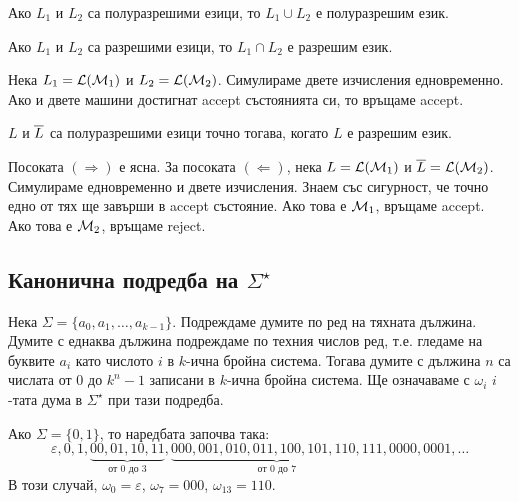 \begin{prop}
  Ако $L_1$ и $L_2$ са полуразрешими езици, то $L_1 \cup L_2$ е полуразрешим език.
\end{prop}

\begin{prop}
  Ако $L_1$ и $L_2$ са разрешими езици, то $L_1 \cap L_2$ е разрешим език.
\end{prop}
\begin{hint}
  Нека $L_1 = \mathcal{L}(\mathcal{M}_1)$ и $L_2 = \mathcal{L}(\mathcal{M}_2)$.
  Симулираме двете изчисления едновременно.
  Ако и двете машини достигнат accept състоянията си, то връщаме accept.
\end{hint}

\begin{framed}
  \begin{thm}
    $L$ и $\overline{L}$ са полуразрешими езици точно тогава, когато $L$ е разрешим език.
  \end{thm}
\end{framed}
\begin{hint}
  Посоката $(\Rightarrow)$ е ясна.
  За посоката $(\Leftarrow)$, нека $L = \mathcal{L}(\mathcal{M}_1)$ и $\overline{L} = \mathcal{L}(\mathcal{M}_2)$.
  Симулираме едновременно и двете изчисления.
  Знаем със сигурност, че точно едно от тях ще завърши в accept състояние.
  Ако това е $\mathcal{M}_1$, връщаме accept.
  Ако това е $\mathcal{M}_2$, връщаме reject.
\end{hint}

\subsection*{Канонична подредба на $\Sigma^\star$}

Нека $\Sigma = \{a_0,a_1,\dots,a_{k-1}\}$.
Подреждаме думите по ред на тяхната дължина.
Думите с еднаква дължина подреждаме по техния числов ред, т.е.
гледаме на буквите $a_i$ като числото $i$ в $k$-ична бройна система.
Тогава думите с дължина $n$ са числата от $0$ до $k^n-1$ записани в $k$-ична бройна система.
Ще означаваме с $\omega_i$ $i$-тата дума в $\Sigma^\star$ при тази подредба.

\begin{example}
  Ако $\Sigma = \{0,1\}$, то наредбата започва така:
  \[\varepsilon, 0, 1, \underbrace{00, 01, 10, 11}_{\text{от $0$ до $3$}}, \underbrace{000, 001, 010, 011, 100, 101, 110, 111}_{\text{от $0$ до $7$}}, 0000, 0001, \dots\]
  В този случай, $\omega_0 = \varepsilon$, $\omega_7 = 000$, $\omega_{13} = 110$.
\end{example}

